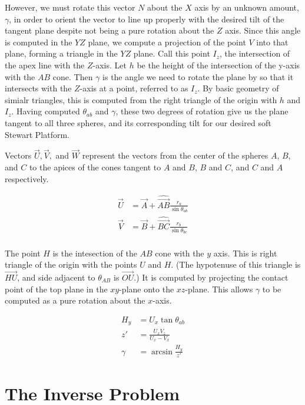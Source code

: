 \documentclass{article}
\begin{document}
However, we must rotate this vector $N$ about the $X$ axis by an unknown amount, $\gamma$, in order
to orient the vector to line up properly with the desired tilt of the tangent plane despite not being a pure rotation about the $Z$ axis. Since this angle is computed in the $YZ$ plane, we compute a projection of the point $V$ into
that plane, forming a triangle in the $YZ$ plane.  Call this point $I_z$, the intersection
of the apex line with the $Z$-axis. Let $h$ be the height of the intersection of the y-axis with the $AB$ cone.
Then $\gamma$ is the angle we need to rotate the plane by so that it intersects with the $Z$-axis at a point, referred to as $I_z$. By basic geometry of simialr triangles, this is computed from the right triangle of the origin with $h$ and $I_z$.
Having computed $\theta_{ab}$ and $\gamma$, these two degrees of rotation give us the plane tangent to all three spheres, and its corresponding tilt for our desired soft Stewart Platform.

Vectors $\overrightarrow{U}, \overrightarrow{V}, $ and $  \overrightarrow{W}$ represent the vectors from the center of the spheres $A$, $B$, and $C$ to
the apices of the cones tangent to $A$ and $B$, $B$ and $C$, and $C$ and $A$ respectively.


\begin{align}
  \overrightarrow{U} &= \overrightarrow{A} + \hat{\overrightarrow{AB}} \frac{r_a}{\sin{\theta_{ab}}} \\
  \overrightarrow{V} &= \overrightarrow{B} + \hat{\overrightarrow{BC}} \frac{r_b}{\sin{\theta_{bc}}} \\
\end{align}

The point $H$ is the intesection of the $AB$ cone with the $y$ axis.
This is right triangle of the origin with the points $U$ and $H$. (The hypotenuse
of this triangle is $\overrightarrow{HU}$, and side adjacent to $\theta_{AB}$ is $\overrightarrow{OU}$.)
It is computed by projecting the contact point of the top plane in the $xy$-plane
onto the $xz$-plane. This allows $\gamma$ to be computed as a pure rotation
about the $x$-axis.

\begin{align}
H_y &= U_x\tan{\theta_{ab}}\\
z' &= \frac{U_xV_z}{U_x - V_x} \\
\gamma &= \arcsin{\frac{H_y}{z'}}
\end{align}



\section{The Inverse Problem}
\end{document}
